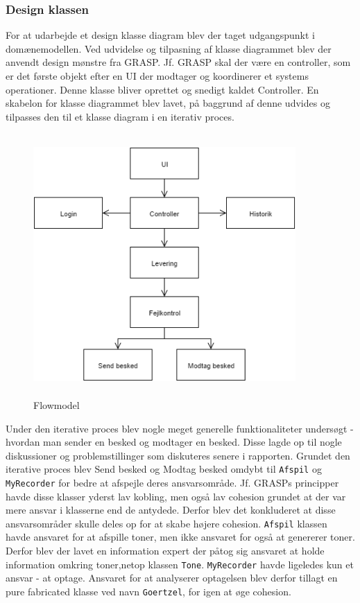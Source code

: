 \subsubsection{Design klassen}
For at udarbejde et design klasse diagram blev der taget udgangspunkt i domænemodellen. Ved udvidelse og tilpasning af klasse diagrammet blev der anvendt design mønstre fra GRASP.
\newline
Jf. GRASP skal der være en controller, som er det første objekt efter en UI der modtager og koordinerer et systems operationer. Denne klasse bliver oprettet og snedigt kaldet Controller.
\newline
En skabelon for klasse diagrammet blev lavet, på baggrund af denne udvides og tilpasses den til et klasse diagram i en iterativ proces.
\begin{figure}[ht]
	\centering
	\includegraphics[width=10cm,height=10cm,keepaspectratio]{pictures/Flow.png}
	\caption{Flowmodel}
	\label{fig:flow}
\end{figure}
\newline
Under den iterative proces blev nogle meget generelle funktionaliteter undersøgt - hvordan man sender en besked og modtager en besked. Disse lagde op til nogle diskussioner og problemstillinger som diskuteres senere i rapporten. Grundet den iterative proces blev Send besked og Modtag besked omdybt til \texttt{Afspil} og \texttt{MyRecorder} for bedre at afspejle deres ansvarsområde. Jf. GRASPs principper havde disse klasser yderst lav kobling, men også lav cohesion grundet at der var mere ansvar i klasserne end de antydede. Derfor blev det konkluderet at disse ansvarsområder skulle deles op for at skabe højere cohesion. \texttt{Afspil} klassen havde ansvaret for at afspille toner, men ikke ansvaret for også at genererer toner. Derfor blev der lavet en information expert der påtog sig ansvaret at holde information omkring toner,netop klassen \texttt{Tone}. \texttt{MyRecorder} havde ligeledes kun et ansvar - at optage. Ansvaret for at analyserer optagelsen blev derfor tillagt en pure fabricated klasse ved navn \texttt{Goertzel}, for igen at øge cohesion.
\hfill \break

